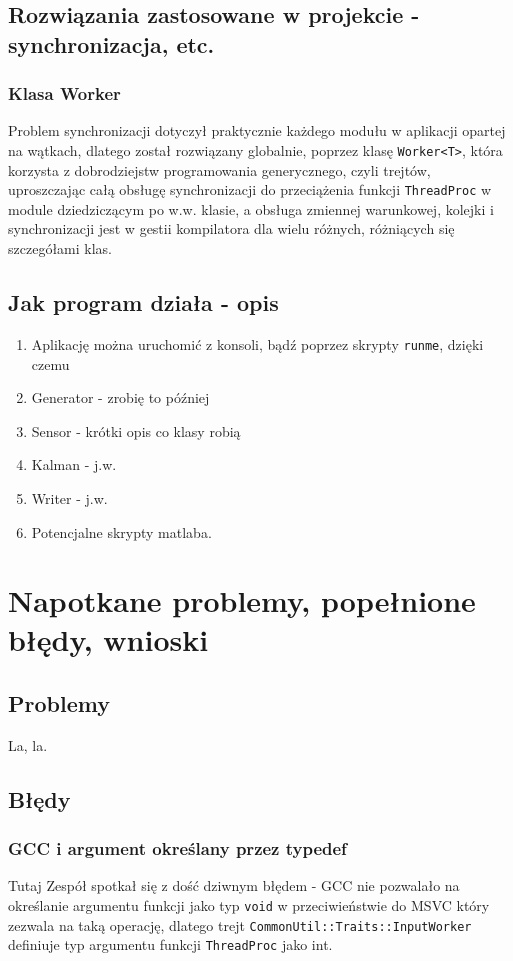 \documentclass{article}
\begin{document}
	\subsection{Rozwiązania zastosowane w projekcie - synchronizacja, etc.}
		\subsubsection{Klasa Worker}
		 Problem synchronizacji dotyczył praktycznie każdego modułu w aplikacji opartej na wątkach, dlatego został rozwiązany globalnie, poprzez klasę \texttt{Worker<T>}, która korzysta z dobrodziejstw programowania generycznego, czyli trejtów, uproszczając całą obsługę synchronizacji do przeciążenia funkcji \texttt{ThreadProc} w module dziedziczącym po w.w. klasie, a obsługa zmiennej warunkowej, kolejki i synchronizacji jest w gestii kompilatora dla wielu różnych, różniących się szczegółami klas.
	\subsection{Jak program działa - opis}
	\begin{enumerate}
		\item Aplikację można uruchomić z konsoli, bądź poprzez skrypty \texttt{runme}, dzięki czemu 
		\item Generator - zrobię to później
		\item Sensor - krótki opis co klasy robią
		\item Kalman - j.w.
		\item Writer - j.w.
		\item Potencjalne skrypty matlaba.
	\end{enumerate}
	
	\section{Napotkane problemy, popełnione błędy, wnioski}
	
	\subsection{Problemy}
	La, la.
	\subsection{Błędy}
	\subsubsection{GCC i argument określany przez typedef}
	Tutaj Zespół spotkał się z dość dziwnym błędem - GCC nie pozwalało na określanie argumentu funkcji jako typ \texttt{void} w przeciwieństwie do MSVC  który zezwala na taką operację, dlatego trejt \texttt{CommonUtil::Traits::InputWorker} definiuje typ argumentu funkcji \texttt{ThreadProc} jako int.  
\end{document}
